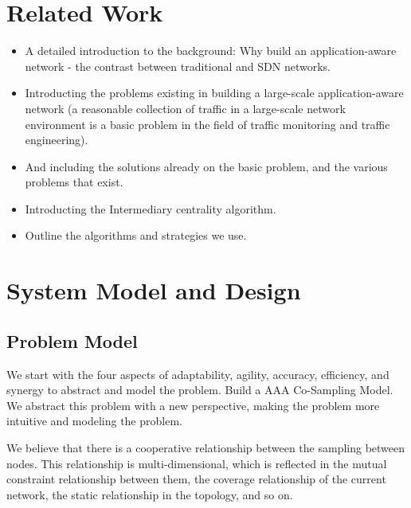 \documentclass[conference,compsoc]{IEEEtran}
\begin{document}
\section{Related Work}
\begin{itemize}

\item A detailed introduction to the background: Why build an application-aware network - the contrast between traditional and SDN networks. 
\item Introducting the problems existing in building a large-scale application-aware network (a reasonable collection of traffic in a large-scale network environment is a basic problem in the field of traffic monitoring and traffic engineering). 
\item And including the solutions already on the basic problem, and the various problems that exist.
\item Introducting the Intermediary centrality algorithm.
\item Outline the algorithms and strategies we use.

\end{itemize}

\section{System Model and Design}

\subsection{Problem  Model}

We start with the four aspects of adaptability, agility, accuracy, efficiency, and synergy to abstract and model the problem. Build a AAA Co-Sampling Model. We abstract this problem with a new perspective, making the problem more intuitive and modeling the problem.

We believe that there is a cooperative relationship between the sampling between nodes. This relationship is multi-dimensional, which is reflected in the mutual constraint relationship between them, the coverage relationship of the current network, the static relationship in the topology, and so on.
\end{document}

